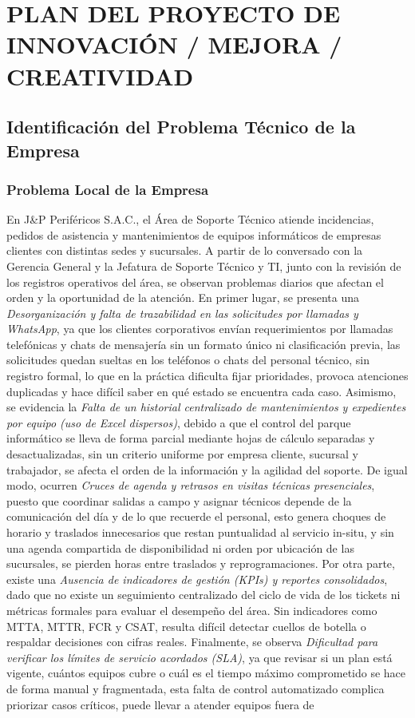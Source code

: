 \chapter[CAPÍTULO II]{PLAN DEL PROYECTO DE INNOVACIÓN / MEJORA / CREATIVIDAD}

\section{Identificación del Problema Técnico de la Empresa}

\subsection{Problema Local de la Empresa}

En J\&P Periféricos S.A.C., el Área de Soporte Técnico atiende incidencias, pedidos de asistencia y mantenimientos de equipos informáticos de empresas clientes con distintas sedes y sucursales. A partir de lo conversado con la Gerencia General y la Jefatura de Soporte Técnico y TI, junto con la revisión de los registros operativos del área, se observan problemas diarios que afectan el orden y la oportunidad de la atención. En primer lugar, se presenta una \textit{Desorganización y falta de trazabilidad en las solicitudes por llamadas y WhatsApp}, ya que los clientes corporativos envían requerimientos por llamadas telefónicas y chats de mensajería sin un formato único ni clasificación previa, las solicitudes quedan sueltas en los teléfonos o chats del personal técnico, sin registro formal, lo que en la práctica dificulta fijar prioridades, provoca atenciones duplicadas y hace difícil saber en qué estado se encuentra cada caso. Asimismo, se evidencia la \textit{Falta de un historial centralizado de mantenimientos y expedientes por equipo (uso de Excel dispersos)}, debido a que el control del parque informático se lleva de forma parcial mediante hojas de cálculo separadas y desactualizadas, sin un criterio uniforme por empresa cliente, sucursal y trabajador, se afecta el orden de la información y la agilidad del soporte. De igual modo, ocurren \textit{Cruces de agenda y retrasos en visitas técnicas presenciales}, puesto que coordinar salidas a campo y asignar técnicos depende de la comunicación del día y de lo que recuerde el personal, esto genera choques de horario y traslados innecesarios que restan puntualidad al servicio in-situ, y sin una agenda compartida de disponibilidad ni orden por ubicación de las sucursales, se pierden horas entre traslados y reprogramaciones. Por otra parte, existe una \textit{Ausencia de indicadores de gestión (KPIs) y reportes consolidados}, dado que no existe un seguimiento centralizado del ciclo de vida de los tickets ni métricas formales para evaluar el desempeño del área. Sin indicadores como MTTA, MTTR, FCR y CSAT, resulta difícil detectar cuellos de botella o respaldar decisiones con cifras reales. Finalmente, se observa \textit{Dificultad para verificar los límites de servicio acordados (SLA)}, ya que revisar si un plan está vigente, cuántos equipos cubre o cuál es el tiempo máximo comprometido se hace de forma manual y fragmentada, esta falta de control automatizado complica priorizar casos críticos, puede llevar a atender equipos fuera de 